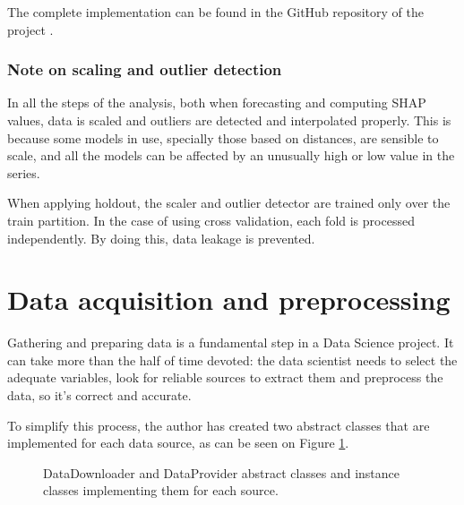 The complete implementation can be found in the GitHub repository of the project \cite{project-repo}.

\subsubsection{Note on scaling and outlier detection}
In all the steps of the analysis, both when forecasting and computing SHAP values, data is scaled and outliers are detected and interpolated properly. This is because some models in use, specially those based on distances, are sensible to scale, and all the models can be affected by an unusually high or low value in the series.

When applying holdout, the scaler and outlier detector are trained only over the train partition. In the case of using cross validation, each fold is processed independently. By doing this, data leakage is prevented.

\section{Data acquisition and preprocessing}
Gathering and preparing data is a fundamental step in a Data Science project. It can take more than the half of time devoted: the data scientist needs to select the adequate variables, look for reliable sources to extract them and preprocess the data, so it's correct and accurate.

To simplify this process, the author has created two abstract classes that are implemented for each data source, as can be seen on Figure \ref{fig:data-down-prov}.

\begin{figure}[H]
\centering
    \caption{DataDownloader and DataProvider abstract classes and instance classes implementing them for each source.}
    \label{fig:data-down-prov}
\end{figure}

